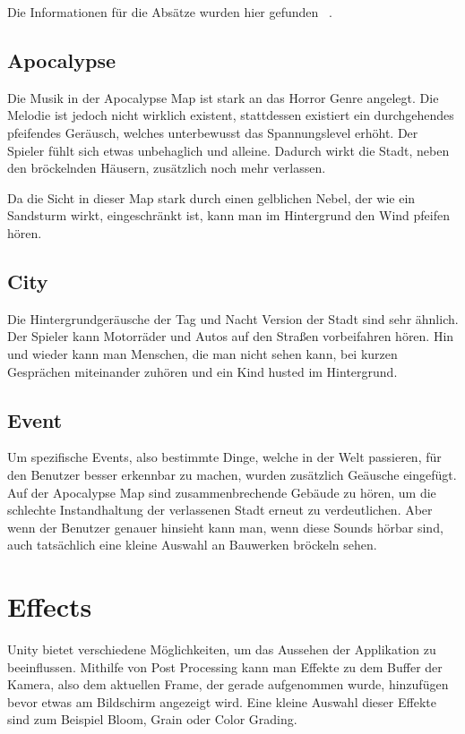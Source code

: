 Die Informationen für die Absätze wurden hier gefunden ~\cite{GK_Media_Factory_Sound_Design_2022}.

\subsection{Apocalypse}\label{subsec:apocalypse-background-sound}
Die Musik in der Apocalypse Map ist stark an das Horror Genre angelegt.
Die Melodie ist jedoch nicht wirklich existent, stattdessen existiert ein durchgehendes pfeifendes Ger\"ausch, welches unterbewusst das Spannungslevel erh\"oht.
Der Spieler f\"uhlt sich etwas unbehaglich und alleine.
Dadurch wirkt die Stadt, neben den br\"ockelnden H\"ausern, zus\"atzlich noch mehr verlassen.

Da die Sicht in dieser Map stark durch einen gelblichen Nebel, der wie ein Sandsturm wirkt, eingeschr\"ankt ist, kann man im Hintergrund den Wind pfeifen h\"oren.

\subsection{City}\label{subsec:day-night-background-sound}
Die Hintergrundger\"ausche der Tag und Nacht Version der Stadt sind sehr \"ahnlich.
Der Spieler kann Motorr\"ader und Autos auf den Straßen vorbeifahren h\"oren.
Hin und wieder kann man Menschen, die man nicht sehen kann, bei kurzen Gespr\"achen miteinander zuh\"oren und ein Kind husted im Hintergrund.

\subsection{Event}\label{subsec:building-collapse-sound}
Um spezifische Events, also bestimmte Dinge, welche in der Welt passieren, f\"ur den Benutzer besser erkennbar zu machen, wurden zus\"atzlich Ge\"ausche eingef\"ugt.
Auf der Apocalypse Map sind zusammenbrechende Geb\"aude zu h\"oren, um die schlechte Instandhaltung der verlassenen Stadt erneut zu verdeutlichen.
Aber wenn der Benutzer genauer hinsieht kann man, wenn diese Sounds h\"orbar sind, auch tats\"achlich eine kleine Auswahl an Bauwerken br\"ockeln sehen.

\section{Effects}\label{sec:effects}
Unity bietet verschiedene M\"oglichkeiten, um das Aussehen der Applikation zu beeinflussen.
Mithilfe von Post Processing kann man Effekte zu dem Buffer der Kamera, also dem aktuellen Frame, der gerade aufgenommen wurde, hinzuf\"ugen bevor etwas am Bildschirm angezeigt wird.
Eine kleine Auswahl dieser Effekte sind zum Beispiel Bloom, Grain oder Color Grading.
~\cite{Unity_Post_Processing_2022}

